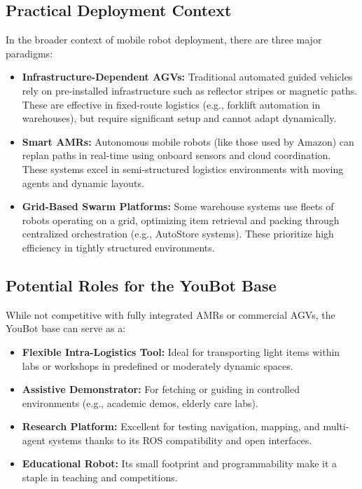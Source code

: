 \documentclass[a4paper, 12pt]{article}
\begin{document}
    \subsection{Practical Deployment Context}

    In the broader context of mobile robot deployment, there are three major paradigms:

    \begin{itemize}[noitemsep]
        \item \textbf{Infrastructure-Dependent AGVs:} Traditional automated guided vehicles rely on pre-installed infrastructure such as reflector stripes or magnetic paths. These are effective in fixed-route logistics (e.g., forklift automation in warehouses), but require significant setup and cannot adapt dynamically.
        \item \textbf{Smart AMRs:} Autonomous mobile robots (like those used by Amazon) can replan paths in real-time using onboard sensors and cloud coordination. These systems excel in semi-structured logistics environments with moving agents and dynamic layouts.
        \item \textbf{Grid-Based Swarm Platforms:} Some warehouse systems use fleets of robots operating on a grid, optimizing item retrieval and packing through centralized orchestration (e.g., AutoStore systems). These prioritize high efficiency in tightly structured environments.
    \end{itemize}

    \subsection{Potential Roles for the YouBot Base}

    While not competitive with fully integrated AMRs or commercial AGVs, the YouBot base can serve as a:

    \begin{itemize}[noitemsep]
        \item \textbf{Flexible Intra-Logistics Tool:} Ideal for transporting light items within labs or workshops in predefined or moderately dynamic spaces.
        \item \textbf{Assistive Demonstrator:} For fetching or guiding in controlled environments (e.g., academic demos, elderly care labs).
        \item \textbf{Research Platform:} Excellent for testing navigation, mapping, and multi-agent systems thanks to its ROS compatibility and open interfaces.
        \item \textbf{Educational Robot:} Its small footprint and programmability make it a staple in teaching and competitions.
    \end{itemize}
\end{document}
